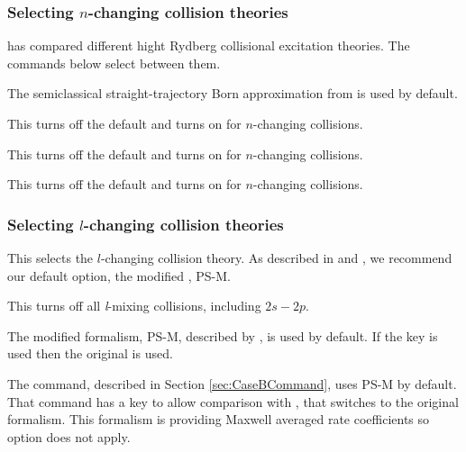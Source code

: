 \subsubsection{Selecting $n$-changing collision theories}

\citet{Guzman.III.2019} has compared different hight Rydberg collisional excitation 
theories. The commands below select between them.

 The semiclassical 
straight-trajectory Born approximation from \citet{Lebedevandbeigman1998} is 
used by default. 

 This turns off the default
\citet{Lebedevandbeigman1998} and turns on \cite{Vriens1980} for $n$-changing
collisions.

 This turns off the default
\citet{Lebedevandbeigman1998} and turns on \cite{Fujimoto1978} for $n$-changing
collisions.

 This turns off the default 
\citet{Lebedevandbeigman1998} and turns on \cite{VanRegemorter1962} for $n$-changing 
collisions. 

\subsubsection{Selecting $l$-changing collision theories}

This selects the $l$-changing collision theory.  
As described in \citet{Guzman.I.2016} and \citet{Guzman.II.2017}, we recommend our default option,
the modified  \citet{PengellySeaton1964}, PS-M.

This turns off all \emph{l}-mixing collisions, including  $2s-2p$.

The  modified \citet{PengellySeaton1964} formalism, PS-M, described by 
\citep{Guzman.II.2017}, is used by default.
 If the key  is used then the original \citet{PengellySeaton1964} is used. 

The  command, described in Section \ref{sec:CaseBCommand},
uses PS-M by default.
That command has a key  to allow comparison with \citet{Hummer1987}, 
that switches to the original \citet{PengellySeaton1964} formalism. This formalism is providing Maxwell averaged rate coefficients so  option does not apply.


